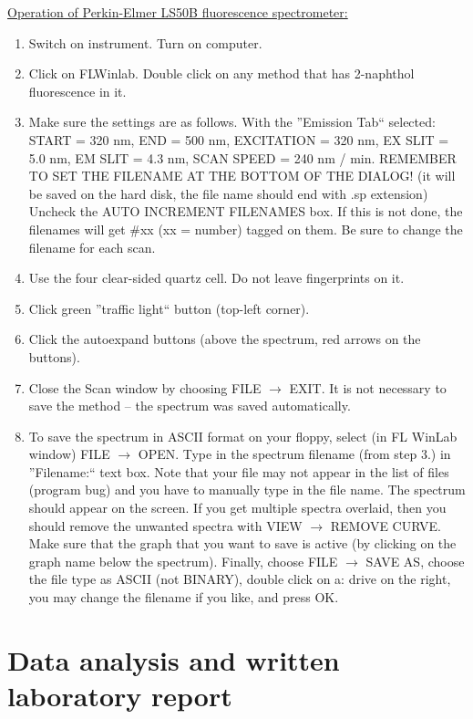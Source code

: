 \documentclass[byrevtex,amssymb,aps,pra,floatfix,letterpaper]{revtex4}
\begin{document}
\noindent
\underline{Operation of Perkin-Elmer LS50B fluorescence spectrometer:}\\

\begin{enumerate}
\item Switch on instrument. Turn on computer.
\item Click on FLWinlab. Double click on any method that has 2-naphthol fluorescence in it.
\item Make sure the settings are as follows. With the ''Emission Tab`` selected: START = 320 nm, END = 500 nm, EXCITATION = 320 nm, EX SLIT = 5.0 nm, EM SLIT = 4.3 nm, SCAN SPEED = 240 nm / min. REMEMBER TO SET THE FILENAME AT THE BOTTOM OF THE DIALOG! (it will be saved on the hard disk, the file name should end with .sp extension) Uncheck the AUTO INCREMENT FILENAMES box. If this is not done, the filenames will get \#xx (xx = number) tagged on them. Be sure to change the
filename for each scan. 
\item Use the four clear-sided quartz cell. Do not leave fingerprints on it.
\item Click green ''traffic light`` button (top-left corner).
\item Click the autoexpand buttons (above the spectrum, red arrows on the buttons).
\item Close the Scan window by choosing FILE $\rightarrow$ EXIT. It is not necessary to save the method -- the spectrum was saved automatically.
\item To save the spectrum in ASCII format on your floppy, select (in FL WinLab window) FILE $\rightarrow$ OPEN. Type in the spectrum filename (from step 3.) in ''Filename:`` text box. Note that your file may not appear in the list of files (program bug) and you have to manually type in the file name. The spectrum should appear on the screen. If you get multiple spectra overlaid, then you should remove the unwanted spectra with VIEW $\rightarrow$ REMOVE CURVE. Make sure that the graph that you want to save is active (by clicking on the graph name below the spectrum). Finally, choose FILE $\rightarrow$ SAVE AS, choose the file type as ASCII (not BINARY), double click on a: drive on the right, you may change the filename if you like, and press OK.
\end{enumerate}

\section{Data analysis and written laboratory report}
\end{document}
